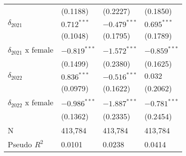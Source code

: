 \begin{tabular}{llll}
                           &           (0.1188) &           (0.2227) &           (0.1850) \\
$\delta_{2021}$            &      $0.712^{***}$ &     $-0.479^{***}$ &      $0.695^{***}$ \\
                           &           (0.1048) &           (0.1795) &           (0.1789) \\
$\delta_{2021}$ x female   &     $-0.819^{***}$ &     $-1.572^{***}$ &     $-0.859^{***}$ \\
                           &           (0.1499) &           (0.2380) &           (0.1625) \\
$\delta_{2022}$            &      $0.836^{***}$ &     $-0.516^{***}$ &            $0.032$ \\
                           &           (0.0979) &           (0.1622) &           (0.2062) \\
$\delta_{2022}$ x female   &     $-0.986^{***}$ &     $-1.887^{***}$ &     $-0.781^{***}$ \\
                           &           (0.1362) &           (0.2335) &           (0.2454) \\
N                          &            413,784 &            413,784 &            413,784 \\
Pseudo $R^2$               &             0.0101 &             0.0238 &             0.0414 \\
\bottomrule
\end{tabular}
